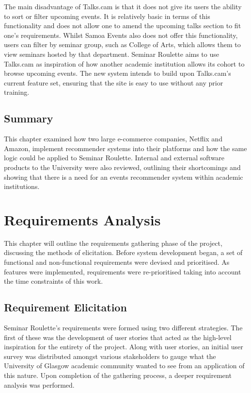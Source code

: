 \documentclass{l4proj}
\begin{document}
The main disadvantage of Talks.cam is that it does not give its users the ability to sort or filter upcoming events. It is relatively basic in terms of this functionality and does not allow one to amend the upcoming talks section to fit one's requirements. Whilst Samoa Events also does not offer this functionality, users can filter by seminar group, such as  College of Arts, which allows them to view seminars hosted by that department. Seminar Roulette aims to use Talks.cam as inspiration of how another academic institution allows its cohort to browse upcoming events. The new system intends to build upon Talks.cam's current feature set, ensuring that the site is easy to use without any prior training.

\section{Summary}

This chapter examined how two large e-commerce companies, Netflix and Amazon, implement recommender systems into their platforms and how the same logic could be applied to Seminar Roulette. Internal and external software products to the University were also reviewed, outlining their shortcomings and showing that there is a need for an events recommender system within academic institutions.

\chapter{Requirements Analysis}
\label{chapter:requirements}

This chapter will outline the requirements gathering phase of the project, discussing the methods of elicitation. Before system development began, a set of functional and non-functional requirements were devised and prioritised. As features were implemented, requirements were re-prioritised taking into account the time constraints of this work.

\section{Requirement Elicitation}

Seminar Roulette's requirements were formed using two different strategies. The first of these was the development of user stories that acted as the high-level inspiration for the entirety of the project. Along with user stories, an initial user survey was distributed amongst various stakeholders to gauge what the University of Glasgow academic community wanted to see from an application of this nature. Upon completion of the gathering process, a deeper requirement analysis was performed.
\end{document}
